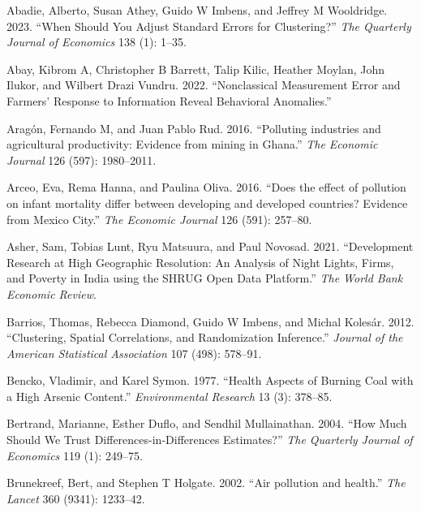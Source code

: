 \documentclass[
]{article}
\newlength{\cslhangindent}
\newlength{\cslentryspacingunit} %
\newenvironment{CSLReferences}[2] %
 {%
  \setlength{\parindent}{0pt}
  \ifodd #1
  \let\oldpar\par
  \def\par{\hangindent=\cslhangindent\oldpar}
  \fi
  \setlength{\parskip}{#2\cslentryspacingunit}
 }%
 {}
\begin{document}
\hypertarget{refs}{}
\begin{CSLReferences}{1}{0}
\leavevmode{}%
Abadie, Alberto, Susan Athey, Guido W Imbens, and Jeffrey M Wooldridge. 2023. {``When Should You Adjust Standard Errors for Clustering?''} \emph{{The Quarterly Journal of Economics}} 138 (1): 1--35.

\leavevmode{}%
Abay, Kibrom A, Christopher B Barrett, Talip Kilic, Heather Moylan, John Ilukor, and Wilbert Drazi Vundru. 2022. {``{Nonclassical Measurement Error and Farmers' Response to Information Reveal Behavioral Anomalies}.''}

\leavevmode{}%
Aragón, Fernando M, and Juan Pablo Rud. 2016. {``{Polluting industries and agricultural productivity: Evidence from mining in Ghana}.''} \emph{{The Economic Journal}} 126 (597): 1980--2011.

\leavevmode{}%
Arceo, Eva, Rema Hanna, and Paulina Oliva. 2016. {``{Does the effect of pollution on infant mortality differ between developing and developed countries? Evidence from Mexico City}.''} \emph{{The Economic Journal}} 126 (591): 257--80.

\leavevmode{}%
Asher, Sam, Tobias Lunt, Ryu Matsuura, and Paul Novosad. 2021. {``{Development Research at High Geographic Resolution: An Analysis of Night Lights, Firms, and Poverty in India using the SHRUG Open Data Platform}.''} \emph{{The World Bank Economic Review}}.

\leavevmode{}%
Barrios, Thomas, Rebecca Diamond, Guido W Imbens, and Michal Kolesár. 2012. {``Clustering, Spatial Correlations, and Randomization Inference.''} \emph{{Journal of the American Statistical Association}} 107 (498): 578--91.

\leavevmode{}%
Bencko, Vladimir, and Karel Symon. 1977. {``Health Aspects of Burning Coal with a High Arsenic Content.''} \emph{{Environmental Research}} 13 (3): 378--85.

\leavevmode{}%
Bertrand, Marianne, Esther Duflo, and Sendhil Mullainathan. 2004. {``How Much Should We Trust Differences-in-Differences Estimates?''} \emph{{The Quarterly Journal of Economics}} 119 (1): 249--75.

\leavevmode{}%
Brunekreef, Bert, and Stephen T Holgate. 2002. {``{Air pollution and health}.''} \emph{{The Lancet}} 360 (9341): 1233--42.


\end{CSLReferences}
\end{document}
